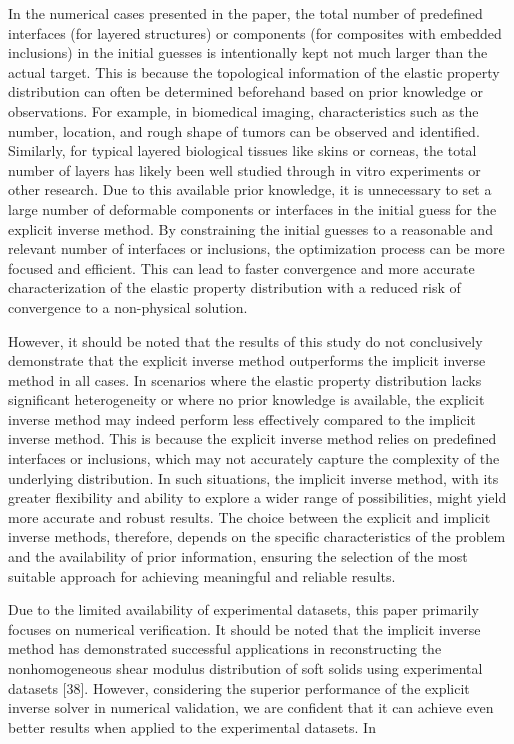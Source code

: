 \documentclass[11pt]{article}
\begin{document}
\vspace{1em}

\noindent
In the numerical cases presented in the paper, the total number
of predefined interfaces (for layered structures) or components
(for composites with embedded inclusions) in the initial guesses
is intentionally kept not much larger than the actual target.
This is because the topological information of the elastic
property distribution can often be determined beforehand based
on prior knowledge or observations. For example, in biomedical
imaging, characteristics such as the number, location, and rough
shape of tumors can be observed and identified. Similarly, for
typical layered biological tissues like skins or corneas, the
total number of layers has likely been well studied through in
vitro experiments or other research. Due to this available prior
knowledge, it is unnecessary to set a large number of
deformable components or interfaces in the initial guess for
the explicit inverse method. By constraining the initial guesses
to a reasonable and relevant number of interfaces or inclusions,
the optimization process can be more focused and efficient.
This can lead to faster convergence and more accurate
characterization of the elastic property distribution with a
reduced risk of convergence to a non-physical solution.

However, it should be noted that the results of this study do
not conclusively demonstrate that the explicit inverse method
outperforms the implicit inverse method in all cases. In
scenarios where the elastic property distribution lacks
significant heterogeneity or where no prior knowledge is
available, the explicit inverse method may indeed perform less
effectively compared to the implicit inverse method. This is
because the explicit inverse method relies on predefined
interfaces or inclusions, which may not accurately capture the
complexity of the underlying distribution. In such situations,
the implicit inverse method, with its greater flexibility and
ability to explore a wider range of possibilities, might yield
more accurate and robust results. The choice between the
explicit and implicit inverse methods, therefore, depends on
the specific characteristics of the problem and the availability
of prior information, ensuring the selection of the most
suitable approach for achieving meaningful and reliable results.

Due to the limited availability of experimental datasets, this
paper primarily focuses on numerical verification. It should be
noted that the implicit inverse method has demonstrated
successful applications in reconstructing the nonhomogeneous
shear modulus distribution of soft solids using experimental
datasets [38]. However, considering the superior performance of
the explicit inverse solver in numerical validation, we are
confident that it can achieve even better results when applied
to the experimental datasets. In
\end{document}

